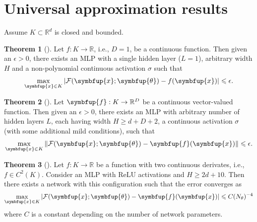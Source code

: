 \documentclass[11pt]{extarticle}
\newcommand{\vf}{\symbfup{f}}
\newcommand{\vx}{\symbfup{x}}
\theoremstyle{definition}
\newcommand{\btheta}{\symbfup{\theta}}
\newcommand{\Ro}{\mathbb{R}}           	                %
\newtheorem{theorem}{Theorem}%
\begin{document}
\section*{Universal approximation results}\label{sec:uni_app_thms}
Assume $K \subset \Ro^d$ is closed and bounded.

\begin{theorem}[\cite{Pinkus1999}]
Let $f:K\to\Ro$, i.e., $D=1$, be a continuous function. Then given an $\epsilon > 0$, there exists an MLP with a single hidden layer ($L=1$), arbitrary width $H$ and a non-polynomial continuous activation $\sigma$ such that
\begin{align*}
  \max_{\vx \in K} |\mathcal{F}(\vx;\btheta) - f(\vx)| \leqslant \epsilon.
\end{align*} 
\end{theorem}

\begin{theorem}[\cite{Kidger2020}]
Let $\vf:K \to \Ro^D$ be a continuous vector-valued function. Then given an $\epsilon >0$, there exists an MLP with arbitrary number of hidden layers $L$, each having width $H \geqslant d + D + 2$, a continuous activation $\sigma$ (with some additional mild conditions), such that
\begin{align*}
\max_{\vx \in K}  \|\mathcal{F}(\vx;\btheta) - \vf(\vx)\| \leqslant \epsilon.
\end{align*} 
\end{theorem}

\begin{theorem}[\cite{Yarotsky2021}]
Let $f:K \to \Ro$ be a function with two continuous derivates, i.e., $f \in C^2(K)$. Consider an MLP with ReLU activations and $H \geqslant 2d + 10$. Then there exists a network with this configuration such that the error converges as
\begin{align*}
\max_{\vx \in K}  |\mathcal{F}(\vx;\btheta) - \vf(\vx)| \leqslant C(N_\theta)^{-4}
\end{align*} 
where $C$ is a constant depending on the number of network parameters.
\end{theorem}

\newpage

\end{document}
